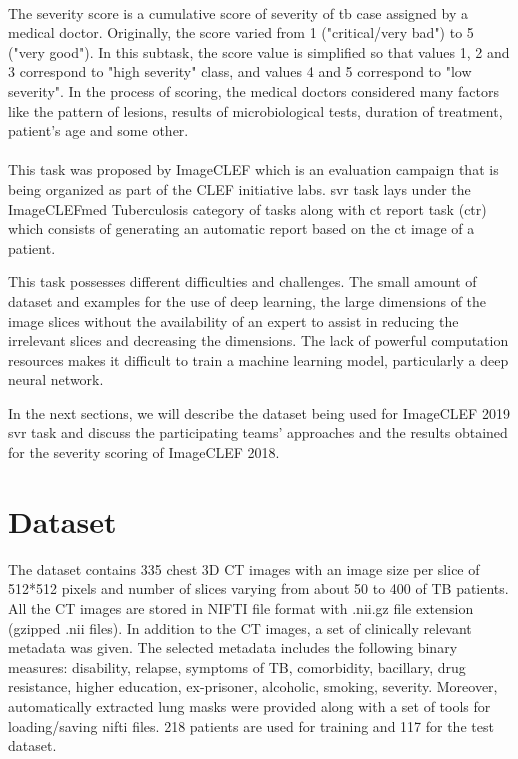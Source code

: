 \paragraph{}
The severity score is a cumulative score of severity of \acs{tb} case assigned by a medical doctor. Originally, the score varied from 1 ("critical/very bad") to 5 ("very good"). In this subtask, the score value is simplified so that values 1, 2 and 3 correspond to "high severity" class, and values 4 and 5 correspond to "low severity". In the process of scoring, the medical doctors considered many factors like the pattern of lesions, results of microbiological tests, duration of treatment, patient's age and some other.
\paragraph{}
This task was proposed by ImageCLEF which is an evaluation campaign that is being organized as part of the CLEF initiative labs. \acs{svr} task lays under the ImageCLEFmed Tuberculosis category of tasks along with \acs{ct} report task (\acs{ctr}) which consists of generating an automatic report based on the \acs{ct} image of a patient.

This task possesses different difficulties and challenges. The small amount of dataset and examples for the use of deep learning, the large dimensions of the image slices without the availability of an expert to assist in reducing the irrelevant slices and decreasing the dimensions. The lack of powerful computation resources makes it difficult to train a machine learning model, particularly a deep neural network.

In the next sections, we will describe the dataset being used for ImageCLEF 2019 \acs{svr} task and discuss the participating teams' approaches and the results obtained for the severity scoring of ImageCLEF 2018.

\section{Dataset}
The dataset contains 335 chest 3D CT images with an image size per slice of 512*512 pixels and number of slices varying from about 50 to 400 of TB patients. All the CT images are stored in NIFTI file format with .nii.gz file extension (gzipped .nii files). In addition to the CT images, a set of clinically relevant metadata was given. The selected metadata includes the following binary measures: disability, relapse, symptoms of TB, comorbidity, bacillary, drug resistance, higher education, ex-prisoner, alcoholic, smoking, severity. Moreover, automatically extracted lung masks were provided along with a set of tools for loading/saving nifti files. 218 patients are used for training and 117 for the test dataset.
